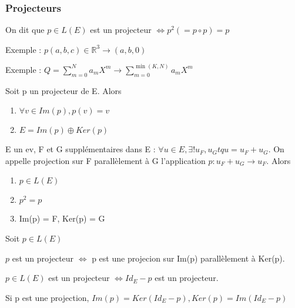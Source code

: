 \documentclass[french]{yLectureNote}
\newcommand{\R}[0]{\mathbb{R}}
\begin{document}
\subsubsection{Projecteurs}
\begin{definition}[Projecteurs]
On dit que \(p\in L(E)\) est un projecteur \(\iff p^2 (= p\circ p) = p\)
\end{definition}
Exemple : $p(a,b,c)\in \R^3 \to (a,b,0)$

Exemple : $Q = \sum_{m=0}^N a_mX^m \to \sum_{m=0}^{\min(K,N)} a_mX^m$

\begin{proposition}
Soit p un projecteur de E. Alors
\begin{enumerate}
 \item \(\forall v \in Im(p), p(v) = v\)
 \item \(E = Im(p)\oplus Ker(p)\)
\end{enumerate}
\end{proposition}
\begin{definition}[Projection]
E un ev, F et G supplémentaires dans E : \(\forall u \in E, \exists! u_F,u_G tq u = u_F+u_G\). On appelle projection sur F parallèlement à G l'application \(p: u_F+u_G \to u_F\). Alors
\begin{enumerate}
 \item \(p\in L(E)\)
 \item \(p^2=p\)
 \item Im(p) = F, Ker(p) = G
\end{enumerate}
\end{definition}
\begin{proposition}[Corollaire]
Soit \(p\in L(E)\)

\(p\) est un projecteur \(\iff\) p est une projecion sur Im(p) parallèlement à Ker(p).
\end{proposition}
\begin{proposition}
\(p\in L(E)\) est un projecteur \(\iff Id_E-p\) est un projecteur.
\end{proposition}
\begin{proposition}[Corollaire]
Si p est une projection, \(Im(p) = Ker(Id_E-p), Ker(p) = Im(Id_E-p)\)
\end{proposition}
\end{document}

